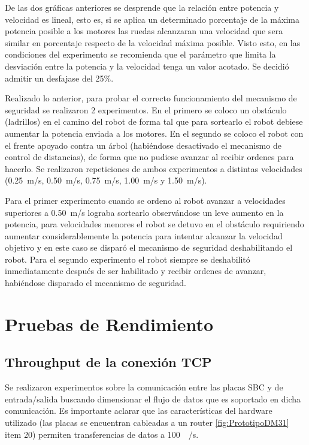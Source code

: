 \documentclass[withindex,glossary]{cam-thesis}
\begin{document}
De las dos gráficas anteriores se desprende que la relación entre potencia y velocidad es lineal, esto es, si se aplica un determinado porcentaje de la máxima potencia posible a los motores las ruedas alcanzaran una velocidad que sera similar en porcentaje respecto de la velocidad máxima posible. Visto esto, en las condiciones del experimento se recomienda que el parámetro que limita la desviación entre la potencia y la velocidad tenga un valor acotado. Se decidió admitir un desfajase del 25\%.

Realizado lo anterior, para probar el correcto funcionamiento del mecanismo de seguridad se realizaron 2 experimentos. En el primero se coloco un obstáculo (ladrillos) en el camino del robot de forma tal que para sortearlo el robot debiese aumentar la potencia enviada a los motores. En el segundo se coloco el robot con el frente apoyado contra un árbol (habiéndose desactivado el mecanismo de control de distancias), de forma que no pudiese avanzar al recibir ordenes para hacerlo. Se realizaron repeticiones de ambos experimentos a distintas velocidades (\SI{0.25}{\metre/\second}, \SI{0.50}{\metre/\second}, \SI{0.75}{\metre/\second}, \SI{1.00}{\metre/\second} y \SI{1.50}{\metre/\second}).

Para el primer experimento cuando se ordeno al robot avanzar a velocidades superiores a \SI{0.50}{\metre/\second} lograba sortearlo observándose un leve aumento en la potencia, para velocidades menores el robot se detuvo en el obstáculo requiriendo aumentar considerablemente la potencia para intentar alcanzar la velocidad objetivo y en este caso se disparó el mecanismo de seguridad deshabilitando el robot. Para el segundo experimento el robot siempre se deshabilitó inmediatamente después de ser habilitado y recibir ordenes de avanzar, habiéndose disparado el mecanismo de seguridad.

\section{Pruebas de Rendimiento}
\subsection{Throughput de la conexión TCP}
Se realizaron experimentos sobre la comunicación entre las placas \gls{SBC} y de entrada/salida buscando dimensionar el flujo de datos que es soportado en dicha comunicación. Es importante aclarar que las características del hardware utilizado (las placas se encuentran cableadas a un router \ref{fig:PrototipoDM31} item 20) permiten transferencias de datos a \SI{100}{\mega\bit/\second}. 
\end{document}
